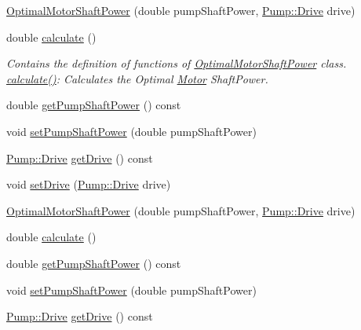 \begin{DoxyCompactItemize}
\item 
\hyperlink{class_optimal_motor_shaft_power_a5b793114a451ef9fe7a29f9db9f44bb6}{Optimal\+Motor\+Shaft\+Power} (double pump\+Shaft\+Power, \hyperlink{class_pump_a32bf0ade131a11bb3b3fb374f638e983}{Pump\+::\+Drive} drive)
\item 
double \hyperlink{class_optimal_motor_shaft_power_a34d47733928ae518fa6f3d08b7d8a12e}{calculate} ()
\begin{DoxyCompactList}\small\item\em Contains the definition of functions of \hyperlink{class_optimal_motor_shaft_power}{Optimal\+Motor\+Shaft\+Power} class. \hyperlink{class_optimal_motor_shaft_power_a34d47733928ae518fa6f3d08b7d8a12e}{calculate()}\+: Calculates the Optimal \hyperlink{class_motor}{Motor} Shaft\+Power. \end{DoxyCompactList}\item 
double \hyperlink{class_optimal_motor_shaft_power_aca7bb632c659ecf2ebf3cb9fdb23626f}{get\+Pump\+Shaft\+Power} () const
\item 
void \hyperlink{class_optimal_motor_shaft_power_ab2d80927fbaa62705359700b2a8f2f26}{set\+Pump\+Shaft\+Power} (double pump\+Shaft\+Power)
\item 
\hyperlink{class_pump_a32bf0ade131a11bb3b3fb374f638e983}{Pump\+::\+Drive} \hyperlink{class_optimal_motor_shaft_power_a23e1045bb2e3ee62205276cbbebbc3ad}{get\+Drive} () const
\item 
void \hyperlink{class_optimal_motor_shaft_power_abd88cbdcba70dbb194a8f957b4467fc7}{set\+Drive} (\hyperlink{class_pump_a32bf0ade131a11bb3b3fb374f638e983}{Pump\+::\+Drive} drive)
\item 
\hyperlink{class_optimal_motor_shaft_power_a5b793114a451ef9fe7a29f9db9f44bb6}{Optimal\+Motor\+Shaft\+Power} (double pump\+Shaft\+Power, \hyperlink{class_pump_a32bf0ade131a11bb3b3fb374f638e983}{Pump\+::\+Drive} drive)
\item 
double \hyperlink{class_optimal_motor_shaft_power_a34d47733928ae518fa6f3d08b7d8a12e}{calculate} ()
\item 
double \hyperlink{class_optimal_motor_shaft_power_aca7bb632c659ecf2ebf3cb9fdb23626f}{get\+Pump\+Shaft\+Power} () const
\item 
void \hyperlink{class_optimal_motor_shaft_power_ab2d80927fbaa62705359700b2a8f2f26}{set\+Pump\+Shaft\+Power} (double pump\+Shaft\+Power)
\item 
\hyperlink{class_pump_a32bf0ade131a11bb3b3fb374f638e983}{Pump\+::\+Drive} \hyperlink{class_optimal_motor_shaft_power_a23e1045bb2e3ee62205276cbbebbc3ad}{get\+Drive} () const

\end{DoxyCompactItemize}
